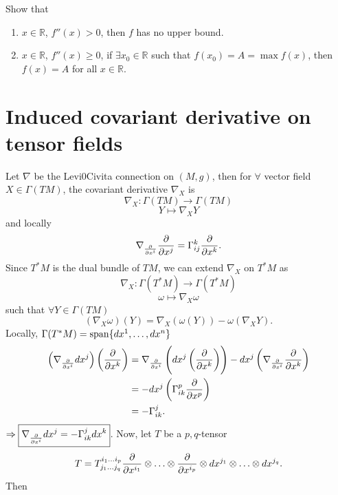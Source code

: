 \begin{exercise}
    Show that
    \begin{enumerate}[(1)]
        \item \(x\in \mathbb{R}\), \(f''(x)>0\), then \(f\) has no upper
        bound.
        \item \(x\in \mathbb{R}\), \(f''(x)\ge 0\), if
        \(\exists x_0\in\mathbb{R}\) such that \(f(x_0)=A=\max f(x)\),
        then \(f(x)=A\) for all \(x\in \mathbb{R}\).
    \end{enumerate}
\end{exercise}
\section{Induced covariant derivative on tensor fields}
Let \(\nabla\) be the Levi0Civita connection on \((M,g)\), then for 
\(\forall\) vector field \(X\in \Gamma(TM)\), the covariant derivative
\(\nabla_X\) is 
\[
    \nabla_X\colon \Gamma(TM)\to \Gamma(TM)    
\]
\[
    Y\mapsto \nabla_X Y    
\]
and locally 
\[
    \nabla_{\pdv{x^i}}\pdv{x^j}=\Gamma\indices*{_{ij}^k}\pdv{x^k}.    
\]
Since \(T^* M\) is the dual bundle of \(TM\), we can extend \(\nabla_X\)
on \(T^*M\) as 
\[
    \nabla_X\colon \Gamma(T^*M)\to \Gamma(T^*M)    
\]
\[
    \omega\mapsto  \nabla_X \omega  
\]
such that \(\forall Y\in \Gamma(TM)\)
\[
    \left(\nabla_X \omega\right)(Y)
    =\nabla_X\left(\omega(Y)\right)-\omega\left(\nabla_X Y\right).
\]
Locally, \(\Gamma(T^*M)=\operatorname{span}\{dx^1,\ldots,dx^n\}\)
\begin{align*}
    \left(\nabla_{\pdv{x^i}}d x^j\right)\left(\pdv{x^k}\right)
    &=\nabla_{\pdv{x^i}}\left(d x^j \left(\pdv{x^k}\right)\right)-
    d x^j\left(\nabla_{\pdv{x^i}}\pdv{x^k}\right)\\
    &=- dx^j\left(\Gamma\indices*{_{ik}^ p}\pdv{x^p}\right)\\
    &=-\Gamma\indices*{_{ik}^j}.
\end{align*}
\(\Rightarrow \boxed{
    \nabla_{\pdv{x^i}}d x^j =-\Gamma\indices*{_{ik}^j} dx^k
}\).
Now, let \(T\) be a \(p,q\)-tensor
\[
    T=\tensor*{T}{^{i_1\ldots i_p}_{j_1\ldots j_q}}
        \pdv{x^{i_1}}\otimes \ldots \otimes\pdv{x^{i_p}}\otimes 
        dx^{j_1}\otimes\ldots \otimes dx^{j_q}.    
\]
Then

